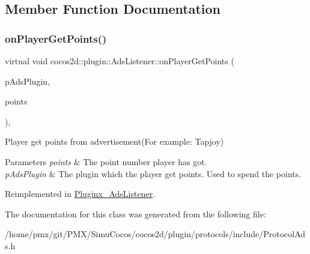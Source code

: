\subsection{Member Function Documentation}
\mbox{\label{classcocos2d_1_1plugin_1_1AdsListener_a820961228a161de9f06cccabfd117d7c}} 
\subsubsection{\texorpdfstring{on\+Player\+Get\+Points()}{onPlayerGetPoints()}}
{\footnotesize\ttfamily virtual void cocos2d\+::plugin\+::\+Ads\+Listener\+::on\+Player\+Get\+Points (\begin{DoxyParamCaption}\item[{\hyperlink{classcocos2d_1_1plugin_1_1ProtocolAds}{Protocol\+Ads} $\ast$}]{p\+Ads\+Plugin,  }\item[{int}]{points }\end{DoxyParamCaption})\hspace{0.3cm}{\ttfamily [inline]}, {\ttfamily [virtual]}}



Player get points from advertisement(\+For example\+: Tapjoy) 


\begin{DoxyParams}{Parameters}
{\em points} & The point number player has got. \\
\hline
{\em p\+Ads\+Plugin} & The plugin which the player get points. Used to spend the points. \\
\hline
\end{DoxyParams}


Reimplemented in \hyperlink{classPluginx__AdsListener_a14d530bc495eebd7fe98bfad76e80d8c}{Pluginx\+\_\+\+Ads\+Listener}.



The documentation for this class was generated from the following file\+:\begin{DoxyCompactItemize}
\item 
/home/pmx/git/\+P\+M\+X/\+Simu\+Cocos/cocos2d/plugin/protocols/include/Protocol\+Ads.\+h\end{DoxyCompactItemize}
